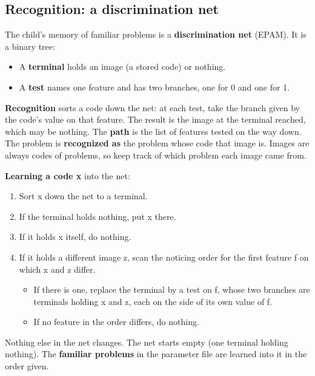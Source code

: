 \subsection{Recognition: a discrimination net}\label{recognition-a-discrimination-net}

The child's memory of familiar problems is a \textbf{discrimination net} (EPAM). It is a binary tree:

\begin{itemize}
\tightlist
\item
  A \textbf{terminal} holds an image (a stored code) or nothing.
\item
  A \textbf{test} names one feature and has two branches, one for 0 and one for 1.
\end{itemize}

\textbf{Recognition} sorts a code down the net: at each test, take the branch given by the code's value on that feature. The result is the image at the terminal reached, which may be nothing. The \textbf{path} is the list of features tested on the way down. The problem is \textbf{recognized as} the problem whose code that image is. Images are always codes of problems, so keep track of which problem each image came from.

\textbf{Learning a code x} into the net:

\begin{enumerate}
\def\labelenumi{\arabic{enumi}.}
\tightlist
\item
  Sort x down the net to a terminal.
\item
  If the terminal holds nothing, put x there.
\item
  If it holds x itself, do nothing.
\item
  If it holds a different image z, scan the noticing order for the first feature f on which x and z differ.

  \begin{itemize}
  \tightlist
  \item
    If there is one, replace the terminal by a test on f, whose two branches are terminals holding x and z, each on the side of its own value of f.
  \item
    If no feature in the order differs, do nothing.
  \end{itemize}
\end{enumerate}

Nothing else in the net changes. The net starts empty (one terminal holding nothing). The \textbf{familiar problems} in the parameter file are learned into it in the order given.

